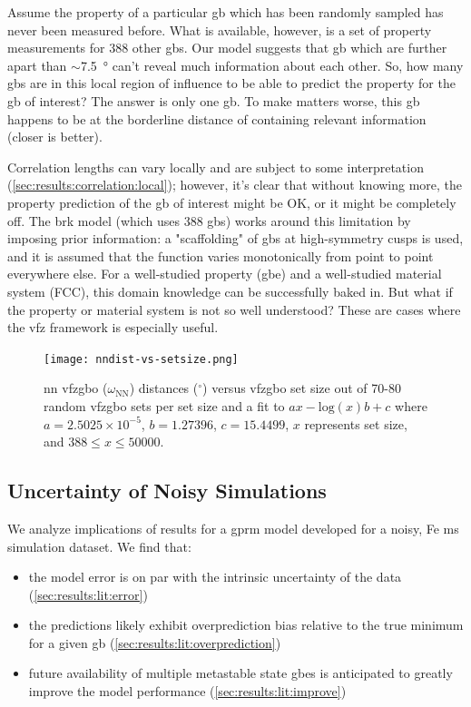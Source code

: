 \documentclass[final,twocolumn,12pt]{elsarticle}
\begin{document}
	Assume the property of a particular \gls{gb} which has been randomly sampled has never been measured before. What is available, however, is a set of property measurements for \num{388} other \glspl{gb}. Our model suggests that \gls{gb} which are further apart than $\sim$\SI{7.5}{\degree} can't reveal much information about each other. So, how many \glspl{gb} are in this local region of influence to be able to predict the property for the \gls{gb} of interest? The answer is only one \gls{gb}. To make matters worse, this \gls{gb} happens to be at the borderline distance of containing relevant information (closer is better).
	
	Correlation lengths can vary locally and are subject to some interpretation (\cref{sec:results:correlation:local}); however, it's clear that without knowing more, the property prediction of the \gls{gb} of interest might be OK, or it might be completely off. The \gls{brk} \cite{bulatovGrainBoundaryEnergy2014} model (which uses \num{388} \glspl{gb}) works around this limitation by imposing prior information: a "scaffolding" of \glspl{gb} at high-symmetry cusps is used, and it is assumed that the function varies monotonically from point to point everywhere else. For a well-studied property (\gls{gbe}) and a well-studied material system (FCC), this domain knowledge can be successfully baked in. But what if the property or material system is not so well understood? These are cases where the \gls{vfz} framework is especially useful.

	\begin{figure}
		\centering
		\texttt{[image: nndist-vs-setsize.png]}
		\caption{\Gls{nn} \gls{vfzgbo} ($\omega_{\text{NN}}$) distances ($^{\circ}$) versus \gls{vfzgbo} set size out of 70-80 random \gls{vfzgbo} sets per set size and a fit to $ax-\mathrm{log}(x)b+c$ where $a=2.5025\times10^{-5}$, $b=1.27396$, $c=15.4499$, $x$ represents set size, and $388 \leq x \leq 50000$.}
		\label{fig:nndist-vs-setsize}
	\end{figure}

	\subsection{Uncertainty of Noisy  Simulations} \label{sec:results:error}
	
	We analyze implications of results for a \gls{gprm} model developed for a noisy, Fe \gls{ms} simulation dataset.
	We find that:
	\begin{itemize}
		\item the model error is on par with the intrinsic uncertainty of the data (\cref{sec:results:lit:error})
		\item the predictions likely exhibit overprediction bias relative to the true minimum for a given \gls{gb} (\cref{sec:results:lit:overprediction})
		\item future availability of multiple metastable state \glspl{gbe} is anticipated to greatly improve the model performance (\cref{sec:results:lit:improve})
	\end{itemize}
	
\end{document}
